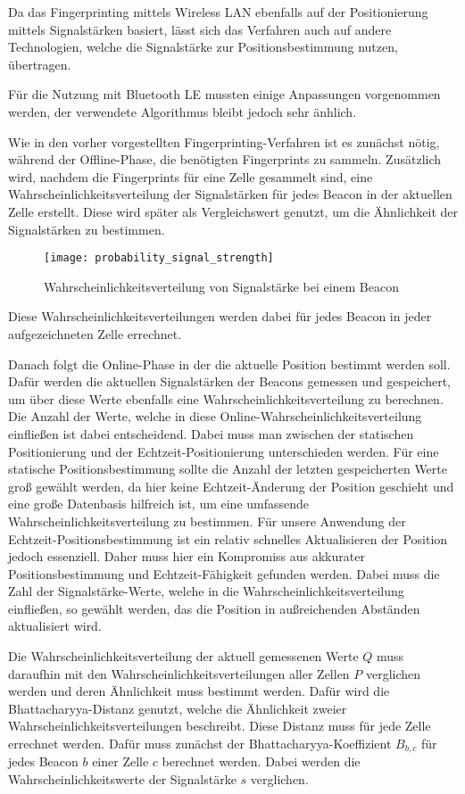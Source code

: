 Da das Fingerprinting mittels Wireless LAN ebenfalls auf der Positionierung mittels Signalstärken basiert, lässt sich das Verfahren auch auf andere Technologien, welche die Signalstärke zur Positionsbestimmung nutzen, übertragen.

Für die Nutzung mit Bluetooth LE mussten einige Anpassungen vorgenommen werden, der verwendete Algorithmus bleibt jedoch sehr änhlich.

Wie in den vorher vorgestellten Fingerprinting-Verfahren ist es zunächst nötig, während der Offline-Phase, die benötigten Fingerprints zu sammeln.
Zusätzlich wird, nachdem die Fingerprints für eine Zelle gesammelt sind, eine Wahrscheinlichkeitsverteilung der Signalstärken für jedes Beacon in der aktuellen Zelle erstellt. Diese wird später als Vergleichswert genutzt, um die Ähnlichkeit der Signalstärken zu bestimmen.

\begin{figure}[htb!]
		\centering
	\texttt{[image: probability\_signal\_strength]}
	\caption{Wahrscheinlichkeitsverteilung von Signalstärke bei einem Beacon}
	\label{probability-signal-strength-beacon}
\end{figure}

Diese Wahrscheinlichkeitsverteilungen werden dabei für jedes Beacon in jeder aufgezeichneten Zelle errechnet.

Danach folgt die Online-Phase in der die aktuelle Position bestimmt werden soll. Dafür werden die aktuellen Signalstärken der Beacons gemessen und gespeichert, um über diese Werte ebenfalls eine Wahrscheinlichkeitsverteilung zu berechnen. Die Anzahl der Werte, welche in diese Online-Wahrscheinlichkeitsverteilung einfließen ist dabei entscheidend.
Dabei muss man zwischen der statischen Positionierung und der Echtzeit-Positionierung unterschieden werden.
Für eine statische Positionsbestimmung sollte die Anzahl der letzten gespeicherten Werte groß gewählt werden, da hier keine Echtzeit-Änderung der Position geschieht und eine große Datenbasis hilfreich ist, um eine umfassende Wahrscheinlichkeitsverteilung zu bestimmen.
Für unsere Anwendung der Echtzeit-Positionsbestimmung ist ein relativ schnelles Aktualisieren der Position jedoch essenziell. Daher muss hier ein Kompromiss aus akkurater Positionsbestimmung und Echtzeit-Fähigkeit gefunden werden. Dabei muss die Zahl der Signalstärke-Werte, welche in die Wahrscheinlichkeitsverteilung einfließen, so gewählt werden, das die Position in außreichenden Abständen aktualisiert wird.

Die Wahrscheinlichkeitsverteilung der aktuell gemessenen Werte $Q$ muss daraufhin mit den Wahrscheinlichkeitsverteilungen aller Zellen $P$ verglichen werden und deren Ähnlichkeit muss bestimmt werden. Dafür wird die Bhattacharyya-Distanz genutzt, welche die Ähnlichkeit zweier Wahrscheinlichkeitsverteilungen beschreibt. 
Diese Distanz muss für jede Zelle errechnet werden. 
Dafür muss zunächst der Bhattacharyya-Koeffizient $B_{b, c}$ für jedes Beacon $b$ einer Zelle $c$ berechnet werden. Dabei werden die Wahrscheinlichkeitswerte der Signalstärke $s$ verglichen.


